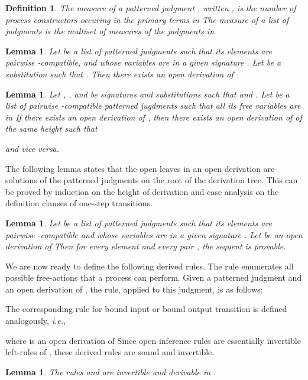 \documentclass{acmtrans2m}
\newenvironment{definition}{\begin{define} \rm}{\end{define}}
\newtheorem{define}[theorem]{Definition}
\newtheorem{lemma}[theorem]{Lemma}
\newcommand{\ie}{{\em i.e.}}
\begin{document}
\begin{definition}
The measure of a patterned judgment ,
written , is the
number of process constructors occuring in the primary terms in 
The measure of a list of judgments  is the multiset of
measures of the judgments in 
\end{definition}


\begin{lemma}
\label{lm:open-drv-exists}
Let  be a list of patterned judgments such that its elements are
pairwise -compatible, and whose variables
are in a given signature . Let  be a substitution such that
. Then there exists an open derivation  of  
\end{lemma}


\begin{lemma}
\label{lm:solution-comp}
Let , ,  and  be signatures and substitutions
such that  and . Let  be a list of
pairwise -compatible patterned jugdments such that all its free variables are in 
If there exists an open derivation  of 
, then there exists an open 
derivation  of  of the same height such that 

and vice versa.
\end{lemma}

The following lemma states that the open leaves in an open derivation are solutions
of the patterned judgments on the root of the derivation tree. This can be proved
by induction on the height of derivation and case analysis on the definition clauses
of one-step transitions.

\begin{lemma}
\label{lm:open-drv-sound}
Let  be a list of patterned judgments such that its elements are pairwise
-compatible and whose variables are in a given signature . 
Let  be an open derivation of  
Then for every element  and every pair
, the sequent
 is provable.
\end{lemma}

We are now ready to define the following derived rules.
The rule  enumerates all possible free-actions that a process can 
perform. Given a patterned judgment  
and an open derivation  of ,
the  rule, applied to this judgment, is as follows:

The corresponding rule for bound input or bound output transition is defined 
analogously, \ie,

where  is an open derivation of 
Since open inference rules are essentially invertible left-rules of ,
these derived rules are sound and invertible.
\begin{lemma}
The rules  and  are invertible and derivable in .
\end{lemma}
\end{document}

